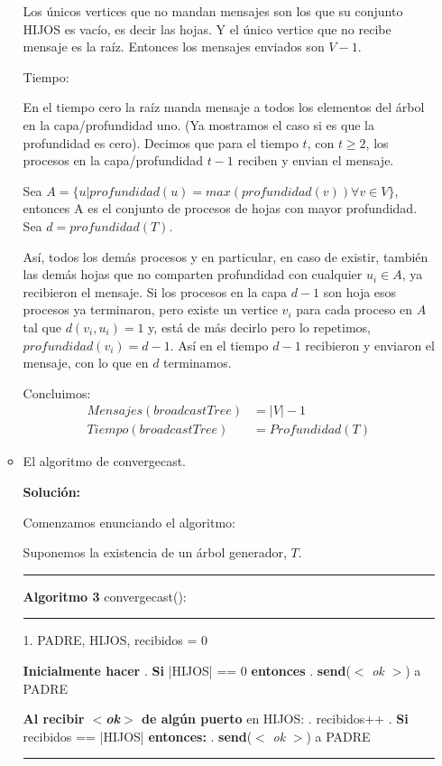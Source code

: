 \documentclass[8pt, letterpaper]{article}
\begin{document}
\begin{enumerate}
\begin{itemize}
  Los únicos vertices que no mandan mensajes son los que su conjunto HIJOS es
  vacío, es decir las hojas. Y el único vertice que no recibe mensaje es la
  raíz. Entonces los mensajes enviados son $V-1$.

  Tiempo:

  En el tiempo cero la raíz manda mensaje a todos los elementos del árbol
  en la capa/profundidad uno. (Ya mostramos el caso si es que la profundidad
  es cero). Decimos que para el tiempo $t$, con $t\geq 2$, los procesos en la
  capa/profundidad $t-1$ reciben y envian el mensaje.

  \hfill\break
  Sea $A=\{u|profundidad(u) = max(profundidad(v)) \forall v\in V\}$, entonces A es el conjunto
  de procesos de hojas con mayor profundidad. Sea $d=profundidad(T)$.

  Así, todos los demás procesos y en particular, en caso de existir,
  también las demás hojas que no comparten profundidad con cualquier $u_i\in A$,
  ya recibieron el mensaje. Si los procesos en la capa $d-1$ son hoja
  esos procesos ya terminaron, pero existe un vertice $v_i$ para cada
  proceso en $A$ tal que $d(v_i, u_i) = 1$ y, está de más decirlo pero lo
  repetimos, $profundidad(v_i) = d-1$. Así en el tiempo $d-1$
  recibieron y enviaron el mensaje, con lo que en $d$ terminamos.

  Concluimos:
  \begin{align*}
    Mensajes(broadcastTree) &= |V|-1 \\
    Tiempo(broadcastTree) &= Profundidad(T)
  \end{align*}
  \rmfamily
  \newpage
\item El algoritmo de convergecast.
  
  \hfill\break
  \ttfamily
  {\bf Solución:}
      
  Comenzamos enunciando el algoritmo:
  
  Suponemos la existencia de un árbol generador, $T$.

  \rule{1\textwidth}{0.2mm}
  {\bf Algoritmo 3} convergecast():
  \hfill\break
  \rule{1\textwidth}{0.2mm}
  1. PADRE, HIJOS, recibidos = 0
  
  \hfill\break
  \hspace*{.2cm} {\bf Inicialmente hacer}
  \hfill{}. {\bf Si} |HIJOS| == 0 {\bf entonces}
  \hfill{}. \hspace{0.5cm} {\bf send}($<$ \textit{ok} $>$) a PADRE
  \hfill\break
  
  \hspace{0.2cm} {\bf Al recibir $<${\it ok}$>$ de algún puerto} en HIJOS:
  \hfill{}. recibidos++
  \hfill{}. {\bf Si} recibidos == |HIJOS| {\bf entonces:}
  \hfill{}. \hspace{1cm} {\bf send}($<$ \textit{ok} $>$) a PADRE
  \hfill\break
  \rule{1\textwidth}{0.2mm}


\end{itemize}
\end{enumerate}
\end{document}
